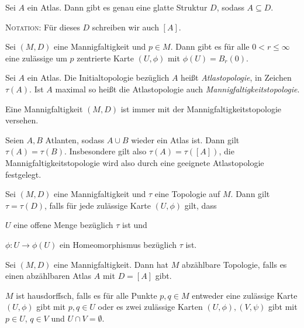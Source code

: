 \begin{proposition}\label{prop:basic:atlasbestimmtstruktur}
  Sei $A$ ein Atlas. Dann gibt es genau eine glatte Struktur $D$,
  sodass $A\subseteq D$.

  \textsc{Notation:} Für dieses $D$ schreiben wir auch $[A]$.
\end{proposition}

\begin{proposition}
  Sei $(M,D)$  eine Mannigfaltigkeit und $p\in M$. Dann gibt es für
  alle $0 < r \leq \infty$ eine zulässige um $p$ zentrierte Karte
  $(U,\phi)$ mit $\phi(U) = B_r(0)$.
\end{proposition}

\begin{definition}
  Sei $A$ ein Atlas. Die Initialtopologie bezüglich $A$ heißt
  \emph{Atlastopologie}, in Zeichen $\tau(A)$. Ist $A$ maximal so heißt die Atlastopologie
  auch \emph{Mannigfaltigkeitstopologie}.

  Eine Mannigfaltigkeit $(M,D)$ ist immer mit der
  Mannigfaltigkeitstopologie versehen.
\end{definition}

\begin{proposition}
  Seien $A,B$ Atlanten, sodass $A\cup B$ wieder ein Atlas ist. Dann
  gilt $\tau(A) = \tau(B)$. Insbesondere gilt also $\tau(A) =
  \tau([A])$, die Mannigfaltigkeitstopologie wird also durch eine
  geeignete Atlastopologie festgelegt.
\end{proposition}

\begin{proposition}
  Sei $(M,D)$ eine Mannigfaltigkeit und $\tau$ eine Topologie auf
  $M$. Dann gilt $\tau = \tau(D)$, falls für jede zulässige Karte
  $(U,\phi)$ gilt, dass
  \begin{properties}
  \item $U$ eine offene Menge bezüglich $\tau$ ist und
  \item $\phi \colon U \to \phi(U)$ ein Homeomorphismus bezüglich
    $\tau$ ist.
  \end{properties}
\end{proposition}

\begin{proposition}
  Sei $(M,D)$ eine Mannigfaltigkeit. Dann hat $M$ abzählbare
  Topologie, falls es einen abzählbaren Atlas $A$ mit $D=[A]$ gibt.

  $M$ ist hausdorffsch, falls es für alle Punkte $p,q\in M$ entweder
  eine zulässige Karte $(U,\phi)$ gibt mit $p,q\in U$ oder es zwei
  zulässige Karten $(U,\phi),(V,\psi)$ gibt mit $p\in U$, $q\in V$ und
  $U\cap V = \emptyset$.
\end{proposition}

